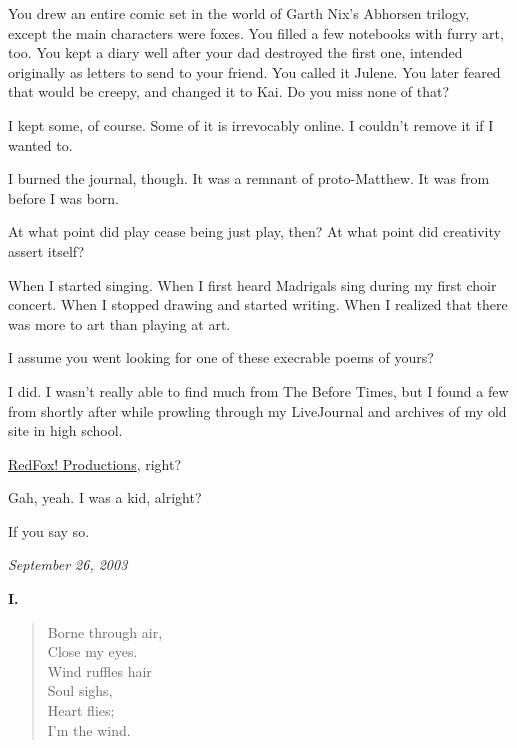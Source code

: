 \begin{paracol}{2}
\begin{leftcolumn}
\begin{ally}
You drew an entire comic set in the world of Garth Nix's Abhorsen trilogy, except the main characters were foxes. You filled a few notebooks with furry art, too. You kept a diary well after your dad destroyed the first one, intended originally as letters to send to your friend. You called it Julene. You later feared that would be creepy, and changed it to Kai. Do you miss none of that?
\end{ally}
I kept some, of course. Some of it is irrevocably online. I couldn't remove it if I wanted to.

I burned the journal, though. It was a remnant of proto-Matthew. It was from before I was born.

\begin{ally}
At what point did play cease being just play, then? At what point did creativity assert itself?
\end{ally}
When I started singing. When I first heard Madrigals sing during my first choir concert. When I stopped drawing and started writing. When I realized that there was more to art than playing at art.
\newpage

\begin{ally}
I assume you went looking for one of these execrable poems of yours?
\end{ally}
I did. I wasn't really able to find much from The Before Times, but I found a few from shortly after while prowling through my LiveJournal and archives of my old site in high school.

\begin{ally}
\href{https://web.archive.org/web/2005*/http://ranna.babylonia.flatirons.org/}{RedFox! Productions}, right?
\end{ally}
Gah, yeah. I was a kid, alright?

\begin{ally}
If you say so.
\end{ally}
\newpage
\end{leftcolumn}
\begin{rightcolumn*}
\emph{September 26, 2003}
\end{rightcolumn*}
\begin{leftcolumn}
\textbf{I.}
\begin{verse}
  Borne through air,\\
\vin   Close my eyes.\\
  Wind ruffles hair\\
\vin   Soul sighs,\\
\vin   Heart flies;\\
  I’m the wind.


\end{verse}
\end{leftcolumn}
\end{paracol}
